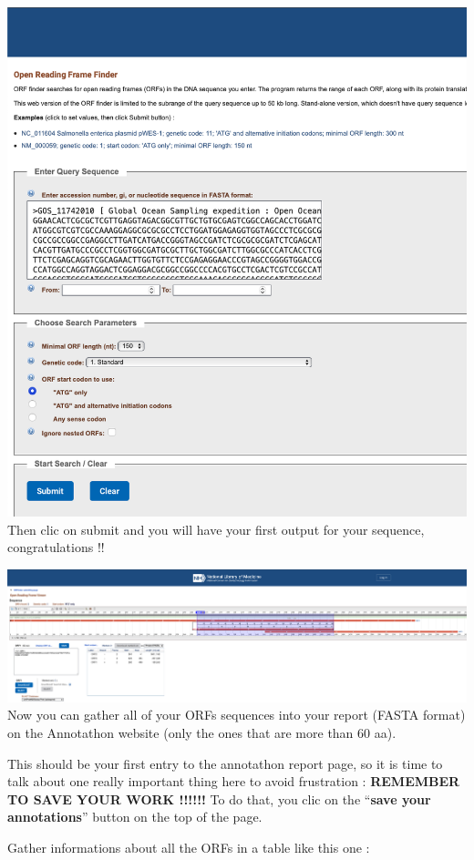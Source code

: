\documentclass[
]{book}
\begin{document}
\includegraphics{figures/Annotathon/Annot_ORF_input.png}
Then clic on submit and you will have your first output for your sequence, congratulations !!

\includegraphics{figures/Annotathon/Annot_ORF_output.png}
Now you can gather all of your ORFs sequences into your report (FASTA format) on the Annotathon website (only the ones that are more than 60 aa).

This should be your first entry to the annotathon report page, so it is time to talk about one really important thing here to avoid frustration : \textbf{REMEMBER TO SAVE YOUR WORK !!!!!!}
To do that, you clic on the ``\textbf{save your annotations}'' button on the top of the page.

Gather informations about all the ORFs in a table like this one :
\end{document}
